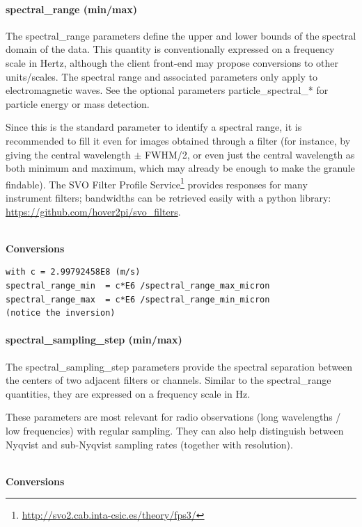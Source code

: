 \documentclass[11pt,a4paper]{ivoa}
\begin{document}
\paragraph{spectral\_range (min/max)}

The spectral\_range parameters define the upper and lower bounds of the
spectral domain of the data. This quantity is conventionally expressed
on a frequency scale in Hertz, although the client front-end may propose
conversions to other units/scales. The spectral range and associated
parameters only apply to electromagnetic waves. See the optional
parameters particle\_spectral\_* for particle energy or mass detection.

Since this is the standard parameter to identify a spectral range, it
is recommended to fill it even for images obtained through a filter
(for instance, by giving the central wavelength $\pm$ FWHM/2, 
or even just the central wavelength as both minimum and maximum,
which may already be enough to make the granule findable). 
The SVO Filter Profile 
Service\footnote{\url{http://svo2.cab.inta-csic.es/theory/fps3/}}
provides responses for many instrument filters;
bandwidths can be retrieved easily with a python library:
\url{https://github.com/hover2pi/svo_filters}.

\textbf{\\}
\textbf{Conversions}

\begin{verbatim}
with c = 2.99792458E8 (m/s)
spectral_range_min  = c*E6 /spectral_range_max_micron
spectral_range_max  = c*E6 /spectral_range_min_micron
(notice the inversion)
\end{verbatim}

\paragraph{spectral\_sampling\_step (min/max)}

The spectral\_sampling\_step parameters provide the spectral separation
between the centers of two adjacent filters or channels. Similar to the
spectral\_range quantities, they are expressed on a frequency scale in Hz.

These parameters are most relevant for radio observations
(long wavelengths / low frequencies) with regular sampling.
They can also help distinguish between Nyqvist and sub-Nyqvist
sampling rates (together with resolution).

\textbf{\\}
\textbf{Conversions}
\end{document}
